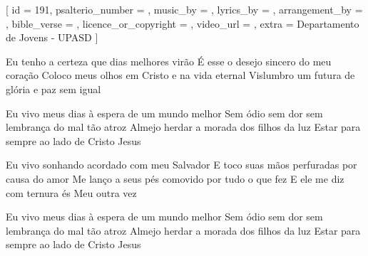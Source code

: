[
    id                     = {191},
    psalterio_number       = {},
    music_by               = {},
    lyrics_by              = {},
    arrangement_by         = {},
    bible_verse            = {},
    licence_or_copyright   = {},
    video_url              = {},
    extra                  = {Departamento de Jovens - UPASD}
]


\beginverse
Eu tenho a certeza que dias melhores virão
É esse o desejo sincero do meu coração
Coloco meus olhos em Cristo e na vida eternal
Vislumbro um futura de glória e paz sem igual
\endverse


\beginchorus
Eu vivo meus dias à espera de um mundo melhor
Sem ódio sem dor sem lembrança do mal tão atroz
Almejo herdar a morada dos filhos da luz
Estar para sempre ao lado de Cristo Jesus
\endchorus




\beginverse
Eu vivo sonhando acordado com meu Salvador
E toco suas mãos perfuradas por causa do amor
Me lanço a seus pés comovido por tudo o que fez
E ele me diz com ternura és Meu outra vez
\endverse


\beginchorus
Eu vivo meus dias à espera de um mundo melhor
Sem ódio sem dor sem lembrança do mal tão atroz
Almejo herdar a morada dos filhos da luz
Estar para sempre ao lado de Cristo Jesus
\endchorus

\endsong
